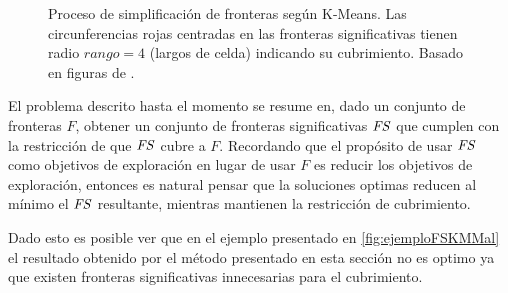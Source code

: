 \begin{figure}[H]
  \caption[Proceso de simplificación de fronteras según K-Means.]{Proceso de
    simplificación de fronteras según K-Means. Las circunferencias rojas
    centradas en las fronteras significativas tienen radio $rango=4$ (largos de celda) indicando su
    cubrimiento. Basado en figuras de \cite{Amorin2019}.}\label{fig:ejemploFrontSig}
\end{figure}


El problema descrito hasta el momento se resume en, dado un conjunto de
fronteras $F$, obtener un conjunto de fronteras significativas $\mathit{FS}$ que
cumplen con la restricción de que $\mathit{FS}$ cubre a $F$. Recordando que el
propósito de usar $\mathit{FS}$ como objetivos de exploración en lugar de usar $F$
es reducir los objetivos de exploración, entonces es natural pensar que la
soluciones optimas reducen al mínimo el $\mathit{FS}$ resultante, mientras
mantienen la restricción de cubrimiento.


Dado esto es posible ver que en el ejemplo presentado en
\ref{fig:ejemploFSKMMal} el resultado obtenido por el método presentado en esta
sección no es optimo ya que existen fronteras significativas innecesarias para
el cubrimiento. 

